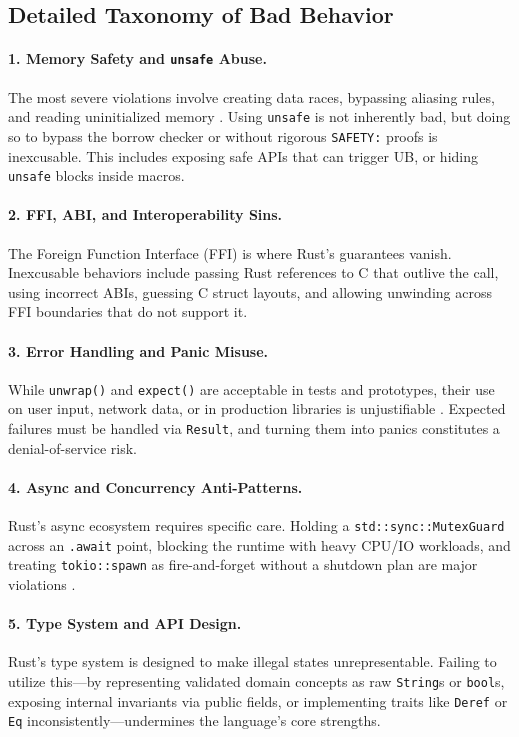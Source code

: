 \subsection{Detailed Taxonomy of Bad Behavior}

\paragraph{1. Memory Safety and \texttt{unsafe} Abuse.}
The most severe violations involve creating data races, bypassing aliasing rules, and reading uninitialized memory \cite{rust_reference_ub}. Using \texttt{unsafe} is not inherently bad, but doing so to bypass the borrow checker or without rigorous \texttt{SAFETY:} proofs is inexcusable. This includes exposing safe APIs that can trigger UB, or hiding \texttt{unsafe} blocks inside macros.

\paragraph{2. FFI, ABI, and Interoperability Sins.}
The Foreign Function Interface (FFI) is where Rust's guarantees vanish. Inexcusable behaviors include passing Rust references to C that outlive the call, using incorrect ABIs, guessing C struct layouts, and allowing unwinding across FFI boundaries that do not support it.

\paragraph{3. Error Handling and Panic Misuse.}
While \texttt{unwrap()} and \texttt{expect()} are acceptable in tests and prototypes, their use on user input, network data, or in production libraries is unjustifiable \cite{rust_api_guidelines}. Expected failures must be handled via \texttt{Result}, and turning them into panics constitutes a denial-of-service risk.

\paragraph{4. Async and Concurrency Anti-Patterns.}
Rust's async ecosystem requires specific care. Holding a \texttt{std::sync::MutexGuard} across an \texttt{.await} point, blocking the runtime with heavy CPU/IO workloads, and treating \texttt{tokio::spawn} as fire-and-forget without a shutdown plan are major violations \cite{tokio_docs}.

\paragraph{5. Type System and API Design.}
Rust's type system is designed to make illegal states unrepresentable. Failing to utilize this---by representing validated domain concepts as raw \texttt{String}s or \texttt{bool}s, exposing internal invariants via public fields, or implementing traits like \texttt{Deref} or \texttt{Eq} inconsistently---undermines the language's core strengths.

